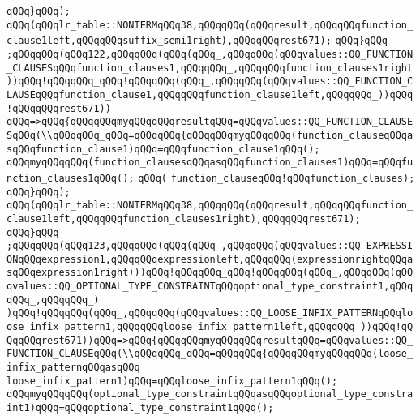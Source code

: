 \verb|qQQq}qQQq);|\newline
\verb|qQQq(qQQqlr_table::NONTERMqQQq38,qQQqqQQq(qQQqresult,qQQqqQQqfunction_clause1left,qQQqqQQqsuffix_semi1right),qQQqqQQqrest671);|\newline
\verb|qQQq}qQQq|\newline
\verb|;qQQqqQQq(qQQq122,qQQqqQQq(qQQq(qQQq_,qQQqqQQq(qQQqvalues::QQ_FUNCTION_CLAUSESqQQqfunction_clauses1,qQQqqQQq_,qQQqqQQqfunction_clauses1right))qQQq!qQQqqQQq_qQQq!qQQqqQQq(qQQq_,qQQqqQQq(qQQqvalues::QQ_FUNCTION_CLAUSEqQQqfunction_clause1,qQQqqQQqfunction_clause1left,qQQqqQQq_))qQQq!qQQqqQQqrest671))|\newline
\verb|qQQq=>qQQq{qQQqqQQqmyqQQqqQQqresultqQQq=qQQqvalues::QQ_FUNCTION_CLAUSESqQQq(\\qQQqqQQq_qQQq=qQQqqQQq{qQQqqQQqmyqQQqqQQq(function_clauseqQQqasqQQqfunction_clause1)qQQq=qQQqfunction_clause1qQQq();|\newline
\verb|qQQqmyqQQqqQQq(function_clausesqQQqasqQQqfunction_clauses1)qQQq=qQQqfunction_clauses1qQQq();|\newline
\verb|qQQq(|\newline
\verb|function_clauseqQQq!qQQqfunction_clauses);|\newline
\verb|qQQq}qQQq);|\newline
\verb|qQQq(qQQqlr_table::NONTERMqQQq38,qQQqqQQq(qQQqresult,qQQqqQQqfunction_clause1left,qQQqqQQqfunction_clauses1right),qQQqqQQqrest671);|\newline
\verb|qQQq}qQQq|\newline
\verb|;qQQqqQQq(qQQq123,qQQqqQQq(qQQq(qQQq_,qQQqqQQq(qQQqvalues::QQ_EXPRESSIONqQQqexpression1,qQQqqQQqexpressionleft,qQQqqQQq(expressionrightqQQqasqQQqexpression1right)))qQQq!qQQqqQQq_qQQq!qQQqqQQq(qQQq_,qQQqqQQq(qQQqvalues::QQ_OPTIONAL_TYPE_CONSTRAINTqQQqoptional_type_constraint1,qQQqqQQq_,qQQqqQQq_)|\newline
\verb|)qQQq!qQQqqQQq(qQQq_,qQQqqQQq(qQQqvalues::QQ_LOOSE_INFIX_PATTERNqQQqloose_infix_pattern1,qQQqqQQqloose_infix_pattern1left,qQQqqQQq_))qQQq!qQQqqQQqrest671))qQQq=>qQQq{qQQqqQQqmyqQQqqQQqresultqQQq=qQQqvalues::QQ_FUNCTION_CLAUSEqQQq(\\qQQqqQQq_qQQq=qQQqqQQq{qQQqqQQqmyqQQqqQQq(loose_infix_patternqQQqasqQQq|\newline
\verb|loose_infix_pattern1)qQQq=qQQqloose_infix_pattern1qQQq();|\newline
\verb|qQQqmyqQQqqQQq(optional_type_constraintqQQqasqQQqoptional_type_constraint1)qQQq=qQQqoptional_type_constraint1qQQq();|\newline
